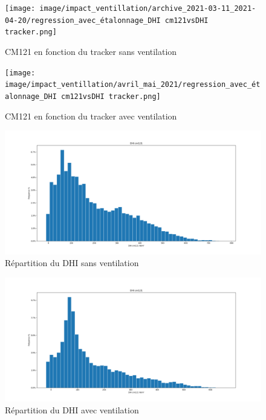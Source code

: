 \documentclass[12pt,a4paper]{article}
\begin{document}
\begin{flushleft}
\begin{figure}[H]
\centering
\texttt{[image: image/impact\_ventillation/archive\_2021-03-11\_2021-04-20/regression\_avec\_étalonnage\_DHI cm121vsDHI tracker.png]}  
\caption{CM121 en fonction du tracker sans ventilation}  
\end{figure}

\begin{figure}[H]
\centering
\texttt{[image: image/impact\_ventillation/avril\_mai\_2021/regression\_avec\_étalonnage\_DHI cm121vsDHI tracker.png]} 
\caption{CM121 en fonction du tracker avec ventilation}  
\end{figure}



\begin{figure}[H]
\centering
\includegraphics[width=15cm]{image/impact_ventillation/archive_2021-03-11_2021-04-20/histogramme_3.png} 
\caption{Répartition du DHI sans ventilation}  
\end{figure}

\begin{figure}[H]
\centering
\includegraphics[width=15cm]{image/impact_ventillation/avril_mai_2021/histogramme_3.png}  
\caption{Répartition du DHI avec ventilation}  
\end{figure}





\end{flushleft}
\end{document}
